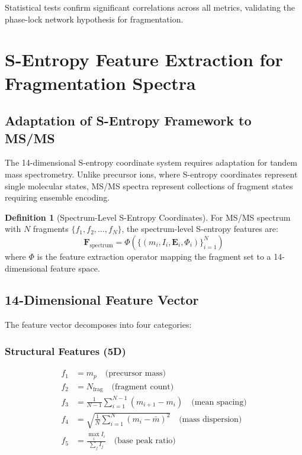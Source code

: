 \documentclass[twocolumn,10pt,a4paper]{article}
\theoremstyle{definition}
\newtheorem{definition}[theorem]{Definition}
\theoremstyle{remark}
\begin{document}
Statistical tests confirm significant correlations across all metrics, validating the phase-lock network hypothesis for fragmentation.

\section{S-Entropy Feature Extraction for Fragmentation Spectra}
\label{sec:sentropy}

\subsection{Adaptation of S-Entropy Framework to MS/MS}

The 14-dimensional S-entropy coordinate system \cite{sachikonye2024gibbs} requires adaptation for tandem mass spectrometry. Unlike precursor ions, where S-entropy coordinates represent single molecular states, MS/MS spectra represent collections of fragment states requiring ensemble encoding.

\begin{definition}[Spectrum-Level S-Entropy Coordinates]
\label{def:spectrum_sentropy}
For MS/MS spectrum with $N$ fragments $\{f_1, f_2, \ldots, f_N\}$, the spectrum-level S-entropy features are:
\begin{equation}
\mathbf{F}_{\text{spectrum}} = \Phi(\{(m_i, I_i, \mathbf{E}_i, \Phi_i)\}_{i=1}^{N})
\end{equation}
where $\Phi$ is the feature extraction operator mapping the fragment set to a 14-dimensional feature space.
\end{definition}

\subsection{14-Dimensional Feature Vector}

The feature vector decomposes into four categories:

\subsubsection{Structural Features (5D)}

\begin{align}
f_1 &= m_p \quad \text{(precursor mass)} \\
f_2 &= N_{\text{frag}} \quad \text{(fragment count)} \\
f_3 &= \frac{1}{N-1}\sum_{i=1}^{N-1}(m_{i+1} - m_i) \quad \text{(mean spacing)} \\
f_4 &= \sqrt{\frac{1}{N}\sum_{i=1}^{N}(m_i - \bar{m})^2} \quad \text{(mass dispersion)} \\
f_5 &= \frac{\max_i I_i}{\sum_j I_j} \quad \text{(base peak ratio)}
\end{align}
\end{document}
